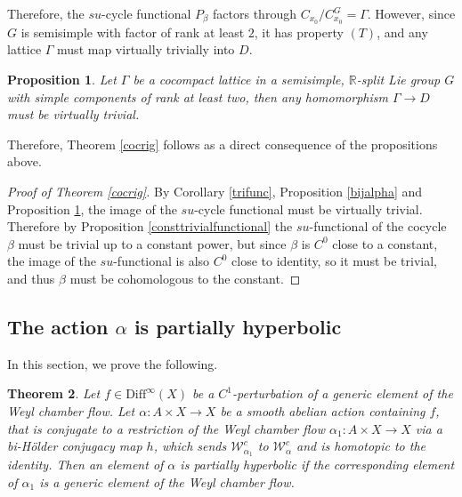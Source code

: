 \documentclass[11pt]{amsart}
\numberwithin{equation}{section}
\newcommand{\R}{\mathbb{R}}
\newcommand{\W}{\mathcal{W}}
\theoremstyle{plain}
\newtheorem{thm}{Theorem}[section]
\newtheorem{prop}[thm]{Proposition}
\begin{document}
Therefore, the $su$-cycle functional $P_\beta$ factors through $C_{x_0}/ C^G_{x_0}=\Gamma$. However, since $G$ is semisimple with factor of rank at least $2$, it has property $(T)$, and any lattice $\Gamma$ must map virtually trivially into $D$.

\begin{prop}\label{latticefin}
 Let $\Gamma$ be a cocompact lattice in a semisimple, $\R$-split Lie group $G$ with simple components of rank at least two, then any homomorphism $\Gamma\to D$ must be virtually trivial.
\end{prop}

Therefore, Theorem \ref{cocrig} follows as a direct consequence of the propositions above. 

\begin{proof}[Proof of Theorem \ref{cocrig}]
 By Corollary \ref{trifunc}, Proposition \ref{bijalpha} and Proposition \ref{latticefin}, the image of the $su$-cycle functional must be virtually trivial. Therefore by Proposition \ref{consttrivialfunctional} the $su$-functional of the cocycle $\beta$ must be trivial up to a constant power, but since $\beta$ is $C^0$ close to a constant, the image of the $su$-functional is also $C^0$ close to identity, so it must be trivial, and thus $\beta$ must be cohomologous to the constant.
\end{proof}

\subsection{The action $\alpha$ is partially hyperbolic}\label{alphaph}


In this section, we prove the following.
\begin{thm}\label{parthyp}
 Let $f\in \mathrm{Diff}^\infty(X)$ be a $C^1$-perturbation of a generic element of the Weyl chamber flow. Let $\alpha:A\times X\to X$ be a smooth abelian action containing $f$, that is conjugate to a restriction of the Weyl chamber flow $\alpha_1: A\times X\to X$ via a  bi-H\"older conjugacy map $h$, which sends $\W^c_{\alpha_1}$ to $\W^c_{\alpha}$ and is homotopic to the identity. Then an element of $\alpha$ is partially hyperbolic if the corresponding element of $\alpha_1$ is a generic element of the Weyl chamber flow.
\end{thm}
\end{document}
